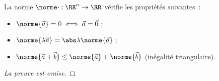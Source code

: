 \documentclass[french,xcolor=svgnames]{beamer}
\begin{document}
\begin{frame}
  \begin{proposition}
    La norme \(\norme \cdot : \RR^{n} \to \RR\) vérifie les propriétés suivantes~:
    \begin{itemize}
    \item \(\norme{\vec a} = 0 \iff \vec a = \vec 0\) ;
    \item \(\norme{\lambda \vec a} = \abs \lambda \norme{\vec a}\) ;\pause
    \item \(\norme{\vec a + \vec b} \leq \norme{\vec a} + \norme{\vec b}\) (inégalité triangulaire).
    \end{itemize}
  \end{proposition}\pause
  \begin{proof}[La preuve est omise]
  \end{proof}
\end{frame}
\end{document}

